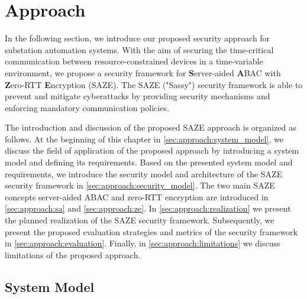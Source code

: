 \chapter{Approach}
\label{ch:approach}
In the following section, we introduce our proposed security approach for substation automation systems.
With the aim of securing the time-critical communication between resource-constrained devices in a time-variable environment, we propose a security framework for \textbf{S}erver-aided \textbf{A}BAC with \textbf{Z}ero-RTT \textbf{E}ncryption (SAZE).
The SAZE ("Sassy") security framework is able to prevent and mitigate cyberattacks by providing security mechanisms and enforcing mandatory communication policies.

The introduction and discussion of the proposed SAZE approach is organized as follows.
At the beginning of this chapter in \autoref{sec:approach:system_model}, we discuss the field of application of the proposed approach by introducing a system model and defining its requirements.
Based on the presented system model and requirements, we introduce the security model and architecture of the SAZE security framework in \autoref{sec:approach:security_model}.
The two main SAZE concepts server-aided ABAC and zero-RTT encryption are introduced in \autoref{sec:approach:sa} and \autoref{sec:approach:ze}.
In \autoref{sec:approach:realization} we present the planned realization of the SAZE security framework.
Subsequently, we present the proposed evaluation strategies and metrics of the security framework in \autoref{sec:approach:evaluation}.
Finally, in \autoref{sec:approach:limitations} we discuss limitations of the proposed approach.

\section{System Model}
\label{sec:approach:system_model}

